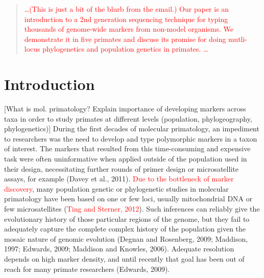 \documentclass[12pt]{article}
\begin{document}
\maketitle

\begin{abstract}
\textcolor{red}{\ldots (This is just a bit of the blurb from the email.) Our paper is an introduction to a 2nd generation sequencing technique for typing thousands of genome-wide markers from non-model organisms.  We demonstrate it in five primates and discuss its promise for doing mutli-locus phylogenetics and population genetics in primates. \ldots}
\end{abstract}

\section{Introduction}

[What is mol. primatology? Explain importance of developing markers across taxa in order to study primates at different levels (population, phylogeography, phylogenetics)] During the first decades of molecular primatology, an impediment to researchers was the need to develop and type polymorphic markers in a taxon of interest. The markers that resulted from this time-consuming and expensive task were often uninformative when applied outside of the population used in their design, necessitating further rounds of primer design or microsatellite assays, for example (Davey et al., 2011). \textcolor{red}{Due to the bottleneck of marker discovery}, many population genetic or phylogenetic studies in molecular primatology have been based on one or few loci, usually mitochondrial DNA or few microsatellites (\textcolor{red}{Ting and Sterner, 2012}). Such inferences can reliably give the evolutionary history of those particular regions of the genome, but they fail to adequately capture the complete complex history of the population given the mosaic nature of genomic evolution (Degnan and Rosenberg, 2009; Maddison, 1997; Edwards, 2009; Maddison and Knowles, 2006). Adequate resolution depends on high marker density, and until recently that goal has been out of reach for many primate researchers (Edwards, 2009).
\end{document}
